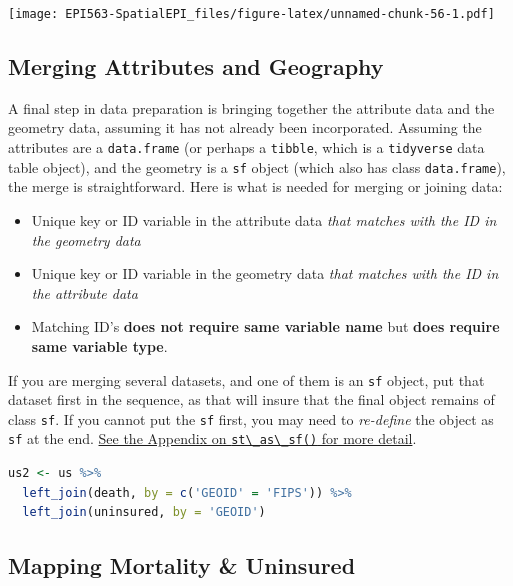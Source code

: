 \documentclass[
]{book}
\newcommand{\passthrough}[1]{#1}
\providecommand{\tightlist}{%
  \setlength{\itemsep}{0pt}\setlength{\parskip}{0pt}}
\begin{document}
\texttt{[image: EPI563-SpatialEPI\_files/figure-latex/unnamed-chunk-56-1.pdf]}

\hypertarget{merging-attributes-and-geography}{%
\subsection{Merging Attributes and Geography}\label{merging-attributes-and-geography}}

A final step in data preparation is bringing together the attribute data and the geometry data, assuming it has not already been incorporated. Assuming the attributes are a \passthrough{\lstinline!data.frame!} (or perhaps a \passthrough{\lstinline!tibble!}, which is a \passthrough{\lstinline!tidyverse!} data table object), and the geometry is a \passthrough{\lstinline!sf!} object (which also has class \passthrough{\lstinline!data.frame!}), the merge is straightforward. Here is what is needed for merging or joining data:

\begin{itemize}
\tightlist
\item
  Unique key or ID variable in the attribute data \emph{that matches with the ID in the geometry data}
\item
  Unique key or ID variable in the geometry data \emph{that matches with the ID in the attribute data}
\item
  Matching ID's \textbf{does not require same variable name} but \textbf{does require same variable type}.
\end{itemize}

If you are merging several datasets, and one of them is an \passthrough{\lstinline!sf!} object, put that dataset first in the sequence, as that will insure that the final object remains of class \passthrough{\lstinline!sf!}. If you cannot put the \passthrough{\lstinline!sf!} first, you may need to \emph{re-define} the object as \passthrough{\lstinline!sf!} at the end. \protect\hyperlink{st-as-sf}{See the Appendix on \passthrough{\lstinline!st\_as\_sf()!} for more detail}.

\begin{lstlisting}[language=R]
us2 <- us %>%
  left_join(death, by = c('GEOID' = 'FIPS')) %>%
  left_join(uninsured, by = 'GEOID')
\end{lstlisting}

\hypertarget{mapping-mortality-uninsured}{%
\subsection{Mapping Mortality \& Uninsured}\label{mapping-mortality-uninsured}}
\end{document}
